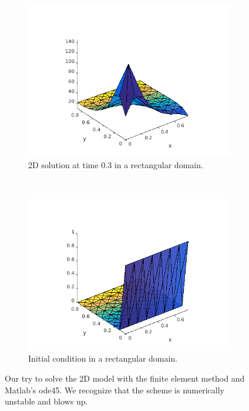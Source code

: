 \begin{figure}[ht]
    \centering
    \begin{subfigure}[b]{0.45\textwidth}
        \includegraphics[width=\textwidth]{2dode45}
        \caption{2D solution at time 0.3 in a rectangular domain.}
    \end{subfigure}
    ~ 
    \begin{subfigure}[b]{0.45\textwidth}
        \includegraphics[width=\textwidth]{2dode45initial}
        \caption{Initial condition in a rectangular domain.}
    \end{subfigure} 
    \caption{Our try to solve the 2D model with the finite element method and Matlab's ode45. We recognize that the scheme is numerically unstable and blows up. }
    \label{fig:2dode45}
\end{figure}

